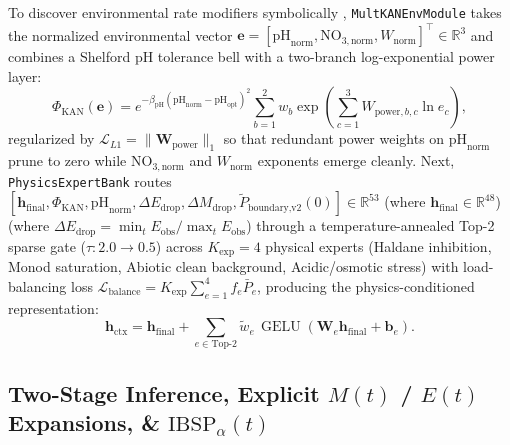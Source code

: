 \documentclass[10pt,twocolumn,a4paper]{article}
\begin{document}
To discover environmental rate modifiers symbolically \cite{liu2024kan2}, \texttt{MultKANEnvModule} takes the normalized environmental vector $\mathbf{e} = [\text{pH}_{\text{norm}}, \text{NO}_{3,\text{norm}}, W_{\text{norm}}]^\top \in \mathbb{R}^3$ and combines a Shelford pH tolerance bell with a two-branch log-exponential power layer:
\begin{equation}
  \Phi_{\text{KAN}}(\mathbf{e}) = e^{-\beta_{\text{pH}}(\text{pH}_{\text{norm}} - \text{pH}_{\text{opt}})^2}\sum_{b=1}^2 w_b\exp\!\left(\sum_{c=1}^3 W_{\text{power},b,c}\ln e_c\right), \label{eq:multkan}
\end{equation}
regularized by $\mathcal{L}_{L1} = \|\mathbf{W}_{\text{power}}\|_1$ so that redundant power weights on $\text{pH}_{\text{norm}}$ prune to zero while $\text{NO}_{3,\text{norm}}$ and $W_{\text{norm}}$ exponents emerge cleanly. Next, \texttt{PhysicsExpertBank} routes $[\mathbf{h}_{\text{final}}, \Phi_{\text{KAN}}, \text{pH}_{\text{norm}}, \Delta E_{\text{drop}}, \Delta M_{\text{drop}}, \tilde{P}_{\text{boundary,v2}}(0)] \in \mathbb{R}^{53}$ (where $\mathbf{h}_{\text{final}} \in \mathbb{R}^{48}$) (where $\Delta E_{\text{drop}} = \min_t E_{\text{obs}}/\max_t E_{\text{obs}}$) through a temperature-annealed Top-2 sparse gate ($\tau: 2.0 \to 0.5$) across $K_{\text{exp}}=4$ physical experts (Haldane inhibition, Monod saturation, Abiotic clean background, Acidic/osmotic stress) with load-balancing loss $\mathcal{L}_{\text{balance}} = K_{\text{exp}}\sum_{e=1}^{4} f_e \bar{P}_e$, producing the physics-conditioned representation:
\begin{equation}
  \mathbf{h}_{\text{ctx}} = \mathbf{h}_{\text{final}} + \sum_{e \in \text{Top-2}} \tilde{w}_e\,\operatorname{GELU}\!\left(\mathbf{W}_e \mathbf{h}_{\text{final}} + \mathbf{b}_e\right). \label{eq:h_ctx}
\end{equation}

\subsection{Two-Stage Inference, Explicit $M(t)$ / $E(t)$ Expansions, \& $\text{IBSP}_\alpha(t)$}
\end{document}
